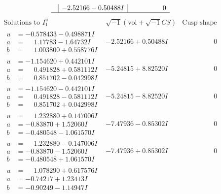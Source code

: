 \documentclass[1p]{elsarticle_modified}
\theoremstyle{definition}
\newcommand{\I}{\sqrt{-1}}
\begin{document}
$$\begin{array}{c|c|c}
 & -2.52166 - 0.50488 I & \phantom{-0.000000 } 0\\
 \hline 
 \end{array}$$\newpage$$\begin{array}{c|c|c}  
\text{Solutions to }I^u_{1}& \I (\text{vol} + \sqrt{-1}CS) & \text{Cusp shape}\\
 \hline 
\begin{aligned}
u &= -0.578433 - 0.498871 I \\
a &= \phantom{-}1.17783 - 1.64732 I \\
b &= \phantom{-}1.003800 + 0.558776 I\end{aligned}
 & -2.52166 + 0.50488 I & \phantom{-0.000000 } 0 \\ \hline\begin{aligned}
u &= -1.154620 + 0.442101 I \\
a &= \phantom{-}0.491828 + 0.581112 I \\
b &= \phantom{-}0.851702 - 0.042998 I\end{aligned}
 & -5.24815 + 8.82520 I & \phantom{-0.000000 } 0 \\ \hline\begin{aligned}
u &= -1.154620 - 0.442101 I \\
a &= \phantom{-}0.491828 - 0.581112 I \\
b &= \phantom{-}0.851702 + 0.042998 I\end{aligned}
 & -5.24815 - 8.82520 I & \phantom{-0.000000 } 0 \\ \hline\begin{aligned}
u &= \phantom{-}1.232880 + 0.147006 I \\
a &= -0.83870 + 1.52060 I \\
b &= -0.480548 - 1.061570 I\end{aligned}
 & -7.47936 - 0.85302 I & \phantom{-0.000000 } 0 \\ \hline\begin{aligned}
u &= \phantom{-}1.232880 - 0.147006 I \\
a &= -0.83870 - 1.52060 I \\
b &= -0.480548 + 1.061570 I\end{aligned}
 & -7.47936 + 0.85302 I & \phantom{-0.000000 } 0 \\ \hline\begin{aligned}
u &= \phantom{-}1.078290 + 0.617576 I \\
a &= -0.74217 + 1.23413 I \\
b &= -0.90249 - 1.14947 I\end{aligned}

\end{array}$$
\end{document}
